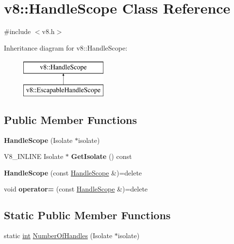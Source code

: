 \hypertarget{classv8_1_1HandleScope}{}\section{v8\+:\+:Handle\+Scope Class Reference}
\label{classv8_1_1HandleScope}


{\ttfamily \#include $<$v8.\+h$>$}

Inheritance diagram for v8\+:\+:Handle\+Scope\+:\begin{figure}[H]
\begin{center}
\leavevmode
\includegraphics[height=2.000000cm]{classv8_1_1HandleScope}
\end{center}
\end{figure}
\subsection*{Public Member Functions}
\begin{DoxyCompactItemize}
\item 
\mbox{\label{classv8_1_1HandleScope_afdb3053d852ea467f026b025ed431e79}} 
{\bfseries Handle\+Scope} (Isolate $\ast$isolate)
\item 
\mbox{\label{classv8_1_1HandleScope_ad605be00a8f9bfd8157806102af95fab}} 
V8\+\_\+\+I\+N\+L\+I\+NE Isolate $\ast$ {\bfseries Get\+Isolate} () const
\item 
\mbox{\label{classv8_1_1HandleScope_a8354f068f3185cb663ecb689587fbbe8}} 
{\bfseries Handle\+Scope} (const \mbox{\hyperlink{classv8_1_1HandleScope}{Handle\+Scope}} \&)=delete
\item 
\mbox{\label{classv8_1_1HandleScope_a6570b4a527ee30057026a15f3ebe62b2}} 
void {\bfseries operator=} (const \mbox{\hyperlink{classv8_1_1HandleScope}{Handle\+Scope}} \&)=delete
\end{DoxyCompactItemize}
\subsection*{Static Public Member Functions}
\begin{DoxyCompactItemize}
\item 
static \mbox{\hyperlink{classint}{int}} \mbox{\hyperlink{classv8_1_1HandleScope_aac722821557f314a9cbe6b8ed8fc9d01}{Number\+Of\+Handles}} (Isolate $\ast$isolate)
\end{DoxyCompactItemize}
